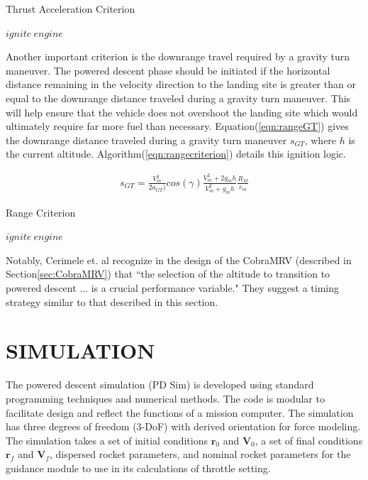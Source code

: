 \begin{algorithm}[H]
	\caption{Thrust Acceleration Criterion}\label{eqn:thrustcriterion}
	\begin{algorithmic}[1]
			\State $ ignite\: engine $
		\EndIf
	\end{algorithmic}
\end{algorithm}




Another important criterion is the downrange travel required by a gravity turn maneuver. The powered descent phase should be initiated if the horizontal distance remaining in the velocity direction to the landing site is greater than or equal to the downrange distance traveled during a gravity turn maneuver. This will help ensure that the vehicle does not overshoot the landing site which would ultimately require far more fuel than necessary. Equation\:(\ref{eqn:rangeGT}) gives the downrange distance traveled during a gravity turn maneuver $s_{GT}$, where $h$ is the current altitude. Algorithm\:(\ref{eqn:rangecriterion}) details this ignition logic.

\begin{equation}
\label{eqn:rangeGT}
\begin{split}
s_{GT} = \frac{V_m^2}{2a_{GT})}cos(\gamma)\frac{V_m^2+2g_mh}{V_m^2+g_mh}\frac{R_M}{r_m}
\end{split}
\end{equation}

\begin{algorithm}
	\caption{Range Criterion}
	\label{eqn:rangecriterion}
	\begin{algorithmic}[1]
			\State $ ignite\: engine $
		\EndIf
	\end{algorithmic}
\end{algorithm}

Notably, Cerimele et. al\:\cite{CERIMELE} recognize in the design of the CobraMRV (described in Section\:\ref{sec:CobraMRV}) that ``the selection of the altitude to transition to powered descent ... is a crucial performance variable." They suggest a timing strategy similar to that described in this section.

\chapter{SIMULATION} \label{chap:simulation}

The powered descent simulation (PD Sim) is developed using standard programming techniques and numerical methods. The code is modular to facilitate design and reflect the functions of a mission computer. The simulation has three degrees of freedom (3-DoF) with derived orientation for force modeling. The simulation takes a set of initial conditions $\bm{r}_0$ and $\bm{V}_0$, a set of final conditions $\bm{r}_f$ and $\bm{V}_f$, dispersed rocket parameters, and nominal rocket parameters for the guidance module to use in its calculations of throttle setting.

